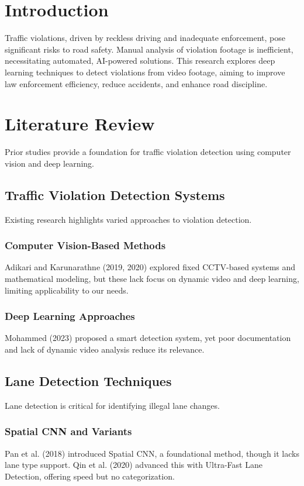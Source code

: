 \documentclass[12pt,a4paper]{article}
\begin{document}
\setcounter{page}{1}
\renewcommand{\thepage}{\arabic{page}}

\section{Introduction}
Traffic violations, driven by reckless driving and inadequate enforcement, pose significant risks to road safety. Manual analysis of violation footage is inefficient, necessitating automated, AI-powered solutions. This research explores deep learning techniques to detect violations from video footage, aiming to improve law enforcement efficiency, reduce accidents, and enhance road discipline.

\section{Literature Review}
Prior studies provide a foundation for traffic violation detection using computer vision and deep learning.

\subsection{Traffic Violation Detection Systems}
Existing research highlights varied approaches to violation detection.

\subsubsection{Computer Vision-Based Methods}
Adikari and Karunarathne (2019, 2020) explored fixed CCTV-based systems and mathematical modeling, but these lack focus on dynamic video and deep learning, limiting applicability to our needs.

\subsubsection{Deep Learning Approaches}
Mohammed (2023) proposed a smart detection system, yet poor documentation and lack of dynamic video analysis reduce its relevance.

\subsection{Lane Detection Techniques}
Lane detection is critical for identifying illegal lane changes.

\subsubsection{Spatial CNN and Variants}
Pan et al. (2018) introduced Spatial CNN, a foundational method, though it lacks lane type support. Qin et al. (2020) advanced this with Ultra-Fast Lane Detection, offering speed but no categorization.
\end{document}
